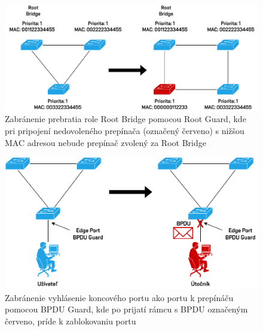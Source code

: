 \begin{figure}[H]
	\begin{center}
		\includegraphics[scale=0.75]{obrazky/root-guard.pdf}
	\end{center}
	\caption[Zabránenie prebratia role Root Bridge pomocou Root Guard]{Zabránenie prebratia role Root Bridge pomocou Root Guard, kde pri pripojení nedovoleného prepínača (označený červeno) s nižšou MAC adresou nebude prepínač zvolený za Root Bridge}
	\label{fig:root-guard}
\end{figure} 

\begin{figure}[H]
	\begin{center}
		\includegraphics[scale=0.75]{obrazky/bpdu-guard.pdf}
	\end{center}
	\caption[Zabránenie vyhlásenie koncového portu ako portu k prepínáču pomocou BPDU Guard]{Zabránenie vyhlásenie koncového portu ako portu k prepínáču pomocou BPDU Guard, kde po prijatí rámcu s BPDU označeným červeno, príde k zablokovaniu portu}
	\label{fig:bpdu-guard}
\end{figure} 

